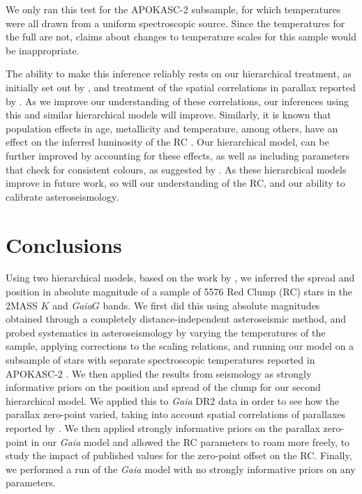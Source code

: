 \documentclass[fleqn,usenatbib]{mnras}
\newcommand{\nstars}{5576 \xspace} %
\newcommand{\gaia}{\emph{Gaia}\xspace}
\newcommand{\nnew}[1]{#1}
\begin{document}
\nnew{We only ran this test for the APOKASC-2 subsample, for which temperatures were all drawn from a uniform spectroscopic source. Since the temperatures for the full \citetalias{art:yu+2018} are not, claims about changes to temperature scales for this sample would be inappropriate.}

The ability to make this inference reliably rests on our hierarchical treatment, as initially set out by , and treatment of the spatial correlations in parallax reported by \cite{art:lindegren+2018}. As we improve our understanding of these correlations, our inferences using this and similar hierarchical models will improve. Similarly, it is known that population effects in age, metallicity and temperature, among others, have an effect on the inferred luminosity of the RC \cite{art:girardi2016}. Our hierarchical model, can be further improved by accounting for these effects, as well as including parameters that check for consistent colours, as suggested by . As these hierarchical models improve in future work, so will our understanding of the RC, and our ability to calibrate asteroseismology.

\section{Conclusions} \label{sec:conclusions}
Using two hierarchical models, based on the work by , we inferred the spread and position in absolute magnitude of a sample of \nstars Red Clump (RC) stars in the 2MASS $K$ and \gaia $G$ bands. We first did this using absolute magnitudes obtained through a completely distance-independent asteroseismic method, and probed systematics in asteroseismology by varying the temperatures of the sample, applying corrections to the scaling relations, and running our model on a subsample of stars with separate spectroscopic temperatures reported in APOKASC-2 \citep{art:pinsonneault+2018}. We then applied the results from seismology as strongly informative priors on the position and spread of the clump for our second hierarchical model. We applied this to \gaia DR2 data in order to see how the parallax zero-point varied, taking into account spatial correlations of parallaxes reported by \cite{art:lindegren+2018}. We then applied strongly informative priors on the parallax zero-point in our \gaia model and allowed the RC parameters to roam more freely, to study the impact of published values for the zero-point offset on the RC. Finally, we performed a run of the \gaia model with no strongly informative priors on any parameters.
\end{document}
